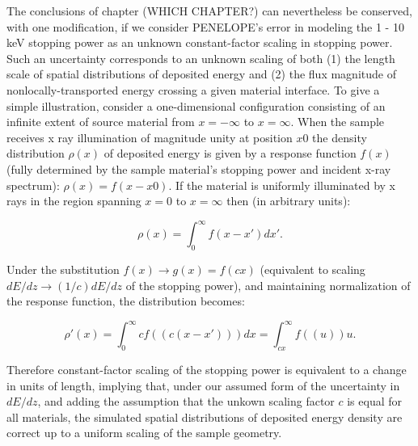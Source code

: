 \documentclass [11pt, proquest, article] {uwthesis}[2016/11/22]
\begin{document}
The conclusions of chapter (WHICH CHAPTER?) can nevertheless be conserved, with one modification, if we consider PENELOPE's error in modeling the 1 - 10 keV stopping power as an unknown constant-factor scaling in stopping power. Such an uncertainty corresponds to an unknown scaling of both (1) the length scale of spatial distributions of deposited energy and (2) the flux magnitude of nonlocally-transported energy crossing a given material interface. To give a simple illustration, consider a one-dimensional configuration consisting of an infinite extent of source material from $x = -\infty$ to $x = \infty$. When the sample receives x ray illumination of magnitude unity at position $x0$ the density distribution $\rho(x)$ of deposited energy is given by a response function $f(x)$ (fully determined by the sample material's stopping power and incident x-ray spectrum): $ \rho(x) = f(x - x0) $. If the material is uniformly illuminated by x rays in the region spanning $x = 0$ to $x = \infty$ then (in arbitrary units):

$$
\rho(x) = \int_0^{\infty} f(x - x') dx'.
$$

Under the substitution $f(x) \rightarrow g(x) = f(c x)$ (equivalent to scaling $dE/dz \rightarrow (1/c) dE/dz$ of the stopping power), and maintaining normalization of the response function, the distribution becomes:

$$
\rho'(x) = \int_0^{\infty} c f((c (x -  x'))) dx = \int_{cx}^{\infty} f((u)) u.
$$

Therefore constant-factor scaling of the stopping power is equivalent to a change in units of length, implying that, under our assumed form of the uncertainty in $dE/dz$, and adding the assumption that the unkown scaling factor $c$ is equal for all materials, the simulated spatial distributions of deposited energy density are correct up to a uniform scaling of the sample geometry. 

\end{document}
